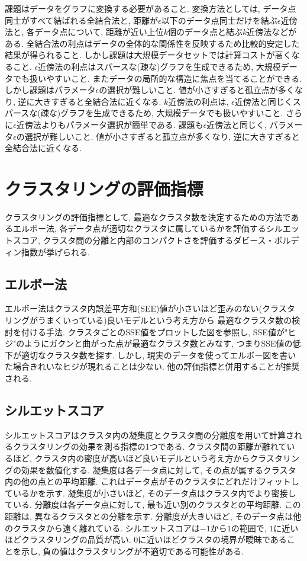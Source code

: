 \documentclass[dvipdfmx, 10pt]{jsarticle}
\begin{document}
課題はデータをグラフに変換する必要があること. 
変換方法としては, データ点同士がすべて結ばれる全結合法と, 距離が\(\epsilon\)以下のデータ点同士だけを結ぶ\(\epsilon\)近傍法と, 
各データ点について, 距離が近い上位\(k\)個のデータ点と結ぶ\(k\)近傍法などがある. 
全結合法の利点はデータの全体的な関係性を反映するため比較的安定した結果が得られること. 
しかし課題は大規模データセットでは計算コストが高くなること. 
\(\epsilon\)近傍法の利点はスパースな(疎な)グラフを生成できるため, 大規模データでも扱いやすいこと. 
またデータの局所的な構造に焦点を当てることができる. 
しかし課題はパラメータ\(\epsilon\)の選択が難しいこと. 値が小さすぎると孤立点が多くなり, 逆に大きすぎると全結合法に近くなる. 
\(k\)近傍法の利点は, \(\epsilon\)近傍法と同じくスパースな(疎な)グラフを生成できるため, 大規模データでも扱いやすいこと. 
さらに\(\epsilon\)近傍法よりもパラメータ選択が簡単である. 課題も\(\epsilon\)近傍法と同じく, 
パラメータ\(\epsilon\)の選択が難しいこと. 値が小さすぎると孤立点が多くなり, 逆に大きすぎると全結合法に近くなる. 

\section*{クラスタリングの評価指標}
クラスタリングの評価指標として, 最適なクラスタ数を決定するための方法であるエルボー法, 
各データ点が適切なクラスタに属しているかを評価するシルエットスコア, 
クラスタ間の分離と内部のコンパクトさを評価するダビース・ボルディン指数が挙げられる. 

\subsection*{エルボー法}
エルボー法はクラスタ内誤差平方和(SEE)値が小さいほど歪みのない(クラスタリングがうまくいっている)良いモデルという考え方から
最適なクラスタ数の検討を付ける手法. クラスタごとのSSE値をプロットした図を参照し, 
SSE値が"ヒジ"のようにガクンと曲がった点が最適なクラスタ数とみなす, つまりSSE値の低下が適切なクラスタ数を探す. 
しかし, 現実のデータを使ってエルボー図を書いた場合きれいなヒジが現れることは少ない. 他の評価指標と併用することが推奨される.

\subsection*{シルエットスコア}
シルエットスコアはクラスタ内の凝集度とクラスタ間の分離度を用いて計算されるクラスタリングの効果を測る指標の1つである. 
クラスタ間の距離が離れているほど, クラスタ内の密度が高いほど良いモデルという考え方からクラスタリングの効果を数値化する. 
凝集度は各データ点に対して, その点が属するクラスタ内の他の点との平均距離. 
これはデータ点がそのクラスタにどれだけフィットしているかを示す. 
凝集度が小さいほど, そのデータ点はクラスタ内でより密接している.
分離度は各データ点に対して, 最も近い別のクラスタとの平均距離. 
この距離は, 異なるクラスタとの分離を示す. 分離度が大きいほど, そのデータ点は他のクラスタから遠く離れている. 
シルエットスコアは\(-1\)から\(1\)の範囲で, \(1\)に近いほどクラスタリングの品質が高い. 
\(0\)に近いほどクラスタの境界が曖昧であることを示し, 負の値はクラスタリングが不適切である可能性がある. 
\end{document}
